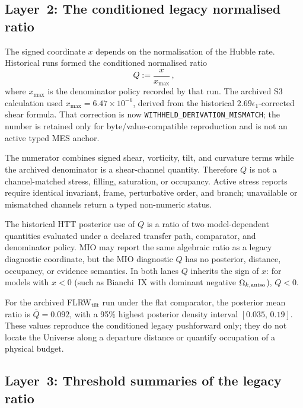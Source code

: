 \subsection{Layer~2: The conditioned legacy normalised ratio}
\label{sec:layer2}

The signed coordinate $x$ depends on the normalisation of the
Hubble rate.  Historical runs formed the conditioned normalised
ratio
\begin{equation}\label{eq:Q-def}
Q := \frac{x}{x_{\max}}\,,
\end{equation}
where $x_{\max}$ is the denominator policy recorded by that run.
The archived S3 calculation used
$x_{\max}=6.47\times10^{-6}$, derived from the historical
$2.69\epsilon_1$-corrected shear formula.  That correction is now
\texttt{WITHHELD\_DERIVATION\_MISMATCH}; the number is retained
only for byte/value-compatible reproduction and is not an active
typed MES anchor.

The numerator combines signed shear, vorticity, tilt, and curvature
terms while the archived denominator is a shear-channel quantity.
Therefore $Q$ is not a channel-matched stress, filling, saturation,
or occupancy.  Active stress reports require identical invariant,
frame, perturbative order, and branch; unavailable or mismatched
channels return a typed non-numeric status.

The historical HTT posterior use of $Q$ is a ratio of two model-dependent
quantities evaluated under a declared transfer path, comparator,
and denominator policy.  MIO may report the same algebraic ratio
as a legacy diagnostic coordinate, but the MIO diagnostic $Q$ has no
posterior, distance, occupancy, or evidence semantics.  In both lanes
$Q$ inherits the sign of $x$: for models with
$x < 0$ (such as Bianchi~IX with dominant negative $\Omega_{k,\mathrm{aniso}}$),
$Q < 0$.

For the archived FLRW$_{\mathrm{tilt}}$ run under the flat comparator,
the posterior mean ratio is $\bar{Q} = 0.092$, with a 95\%
highest posterior density interval
$[0.035,\, 0.19]$.  These values reproduce the conditioned legacy
pushforward only; they do not locate the Universe along a departure
distance or quantify occupation of a physical budget.


\subsection{Layer~3: Threshold summaries of the legacy ratio}
\label{sec:layer3}

